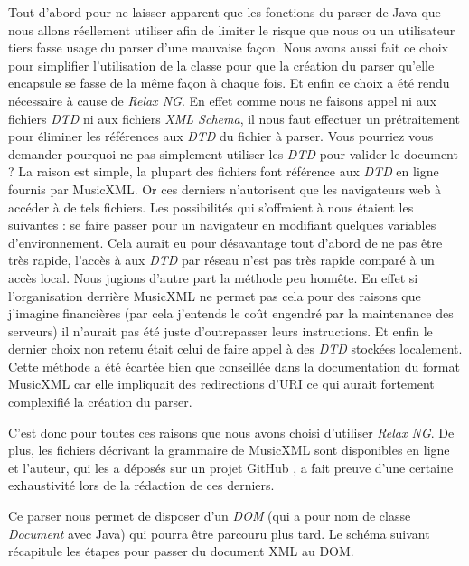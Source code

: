 \par
Tout d'abord pour ne laisser apparent que les fonctions du parser de Java que
nous allons réellement utiliser afin de limiter le risque que nous ou un utilisateur
tiers fasse usage du parser d'une mauvaise façon. Nous avons aussi fait ce choix pour simplifier
l'utilisation de la classe pour que la création du parser qu'elle encapsule se fasse de la même façon à chaque fois.
Et enfin ce choix a été rendu nécessaire à cause de \emph{Relax NG}. En effet comme nous
ne faisons appel ni aux fichiers \emph{DTD} ni aux fichiers \emph{XML Schema}, il nous
faut effectuer un prétraitement pour éliminer les références aux \emph{DTD} du
fichier à parser. Vous pourriez vous demander pourquoi ne pas simplement
utiliser les \emph{DTD} pour valider le document ? La raison est simple,
la plupart des fichiers font référence aux \emph{DTD} en ligne fournis par
MusicXML. Or ces derniers n'autorisent que les navigateurs web à accéder à de tels
fichiers. Les possibilités qui s'offraient à nous étaient les suivantes : se faire
passer pour un navigateur en modifiant quelques variables d’environnement. Cela
aurait eu pour désavantage tout d'abord de ne pas être très rapide, l'accès à
aux \emph{DTD} par réseau n'est pas très rapide comparé à un accès local.
Nous jugions d'autre part la méthode peu honnête. En effet si l'organisation derrière MusicXML
ne permet pas cela pour des raisons que j'imagine financières (par cela j'entends le coût engendré par la maintenance des serveurs)
il n'aurait pas été juste d'outrepasser leurs instructions. Et enfin le dernier choix non retenu était celui de faire appel
à des \emph{DTD} stockées localement. Cette méthode a été écartée bien que conseillée
dans la documentation du format MusicXML car elle impliquait des redirections d'URI
ce qui aurait fortement complexifié la création du parser.


\par
C'est donc pour toutes ces raisons que nous avons choisi d'utiliser \emph{Relax NG}.
De plus, les fichiers décrivant la grammaire de MusicXML sont disponibles en ligne
et l'auteur, qui les a déposés sur un projet GitHub \cite{relaxng_for_musicxml}, 
a fait preuve d'une certaine exhaustivité lors de la rédaction de ces derniers.

\par
Ce parser nous permet de disposer d'un \emph{DOM} (qui a pour nom de classe \emph{Document} avec Java)
qui pourra être parcouru plus tard. Le schéma suivant récapitule les étapes pour passer du document XML au DOM.


